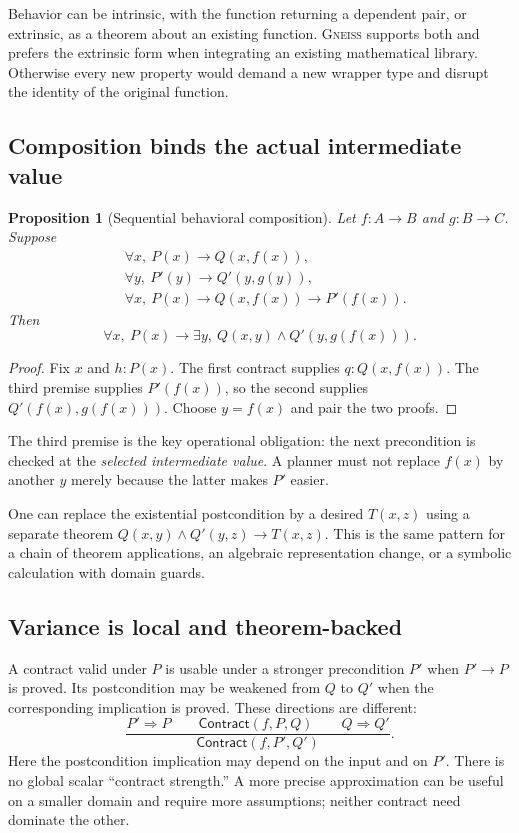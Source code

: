 \documentclass[11pt,letterpaper]{article}
\newcommand{\Gneiss}{\textsc{Gneiss}}
\newcommand{\Contract}{\mathsf{Contract}}
\newtheorem{proposition}[theorem]{Proposition}
\theoremstyle{definition}
\theoremstyle{remark}
\begin{document}
Behavior can be intrinsic, with the function returning a dependent pair, or
extrinsic, as a theorem about an existing function. \Gneiss{} supports both and
prefers the extrinsic form when integrating an existing mathematical library.
Otherwise every new property would demand a new wrapper type and disrupt the
identity of the original function.

\subsection{Composition binds the actual intermediate value}
\begin{proposition}[Sequential behavioral composition]\label{prop:comp}
Let $f:A\to B$ and $g:B\to C$. Suppose
\[
\begin{aligned}
 &\forall x,\ P(x)\to Q(x,f(x)),\\
 &\forall y,\ P'(y)\to Q'(y,g(y)),\\
 &\forall x,\ P(x)\to Q(x,f(x))\to P'(f(x)).
\end{aligned}
\]
Then
\[
 \forall x,\ P(x)\to
   \exists y,\ Q(x,y)\wedge Q'(y,g(f(x))).
\]
\end{proposition}
\begin{proof}
Fix $x$ and $h:P(x)$. The first contract supplies $q:Q(x,f(x))$. The third
premise supplies $P'(f(x))$, so the second supplies $Q'(f(x),g(f(x)))$.
Choose $y=f(x)$ and pair the two proofs.
\end{proof}
The third premise is the key operational obligation: the next precondition is
checked at the \emph{selected intermediate value}. A planner must not replace
$f(x)$ by another $y$ merely because the latter makes $P'$ easier.

One can replace the existential postcondition by a desired $T(x,z)$ using a
separate theorem $Q(x,y)\wedge Q'(y,z)\to T(x,z)$. This is the same pattern for
a chain of theorem applications, an algebraic representation change, or a
symbolic calculation with domain guards.

\subsection{Variance is local and theorem-backed}
A contract valid under $P$ is usable under a stronger precondition $P'$ when
$P'\to P$ is proved. Its postcondition may be weakened from $Q$ to $Q'$ when
the corresponding implication is proved. These directions are different:
\[
\frac{P'\Rightarrow P\qquad \Contract(f,P,Q)\qquad Q\Rightarrow Q'}
     {\Contract(f,P',Q')}.
\]
Here the postcondition implication may depend on the input and on $P'$. There
is no global scalar ``contract strength.'' A more precise approximation can
be useful on a smaller domain and require more assumptions; neither contract
need dominate the other.
\end{document}
